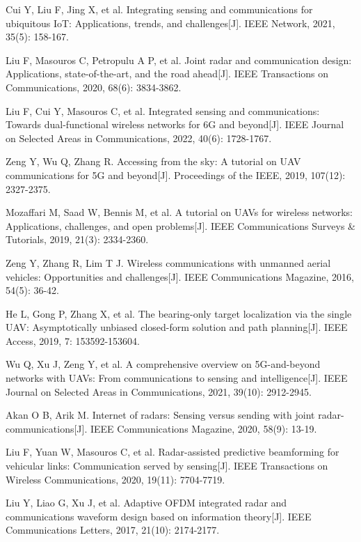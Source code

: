 \noindent
[2]\quad Cui Y, Liu F, Jing X, et al. Integrating sensing and communications for ubiquitous IoT: Applications, trends, and challenges[J]. IEEE Network, 2021, 35(5): 158-167.

\noindent
[3]\quad Liu F, Masouros C, Petropulu A P, et al. Joint radar and communication design: Applications, state-of-the-art, and the road ahead[J]. IEEE Transactions on Communications, 2020, 68(6): 3834-3862.

\noindent
[4]\quad Liu F, Cui Y, Masouros C, et al. Integrated sensing and communications: Towards dual-functional wireless networks for 6G and beyond[J]. IEEE Journal on Selected Areas in Communications, 2022, 40(6): 1728-1767.

\noindent
[5]\quad Zeng Y, Wu Q, Zhang R. Accessing from the sky: A tutorial on UAV communications for 5G and beyond[J]. Proceedings of the IEEE, 2019, 107(12): 2327-2375.

\noindent
[6]\quad Mozaffari M, Saad W, Bennis M, et al. A tutorial on UAVs for wireless networks: Applications, challenges, and open problems[J]. IEEE Communications Surveys \& Tutorials, 2019, 21(3): 2334-2360.

\noindent
[7]\quad Zeng Y, Zhang R, Lim T J. Wireless communications with unmanned aerial vehicles: Opportunities and challenges[J]. IEEE Communications Magazine, 2016, 54(5): 36-42.

\noindent
[8]\quad He L, Gong P, Zhang X, et al. The bearing-only target localization via the single UAV: Asymptotically unbiased closed-form solution and path planning[J]. IEEE Access, 2019, 7: 153592-153604.

\noindent
[9]\quad Wu Q, Xu J, Zeng Y, et al. A comprehensive overview on 5G-and-beyond networks with UAVs: From communications to sensing and intelligence[J]. IEEE Journal on Selected Areas in Communications, 2021, 39(10): 2912-2945.

\noindent
[10]\quad Akan O B, Arik M. Internet of radars: Sensing versus sending with joint radar-communications[J]. IEEE Communications Magazine, 2020, 58(9): 13-19.

\noindent
[11]\quad Liu F, Yuan W, Masouros C, et al. Radar-assisted predictive beamforming for vehicular links: Communication served by sensing[J]. IEEE Transactions on Wireless Communications, 2020, 19(11): 7704-7719.

\noindent
[12]\quad Liu Y, Liao G, Xu J, et al. Adaptive OFDM integrated radar and communications waveform design based on information theory[J]. IEEE Communications Letters, 2017, 21(10): 2174-2177.

